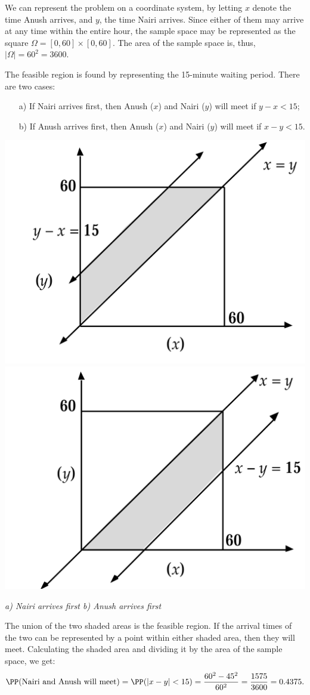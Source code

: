 \begin{solution} %
We can represent the problem on a coordinate
system, by letting $x$ denote the time Anush arrives, and $y$, the time Nairi arrives. Since either of them may arrive at any time within the entire hour, the sample space may be
represented as the square $\Omega = [0,60]\times [0,60]$. The area of the sample space is, thus, $|\Omega|=60^2=3600$.

The feasible region is found by representing the 15-minute waiting
period. There are two cases:
\begin{enumerate}
    \item[a) ] If Nairi arrives first, then Anush ($x$) and Nairi ($y$) will meet if $y - x < 15$;
    
    \item[b) ] If Anush arrives first, then Anush ($x$) and Nairi ($y$) will meet if $x - y < 15$.
\end{enumerate}

\includegraphics[width=0.4\linewidth]{figs/region2.png}
\includegraphics[width=0.4\linewidth]{figs/region1.png}
\\
\begin{center}
    \textit{
\qquad  a) Nairi arrives first \qquad  \qquad \qquad \quad b) Anush arrives first \qquad\qquad\qquad}
\end{center}

The union of the two shaded areas is the feasible region. If the
arrival times of the two can be represented by a point within
either shaded area, then they will meet. Calculating the shaded area and dividing it by the area of the sample space, we get:
\[
\PP(\text{Nairi and Anush will meet}) = \PP(|x-y|<15) = \dfrac{60^2-45^2}{60^2} = \dfrac{1575}{3600} = 0.4375.
\]


\end{solution}
